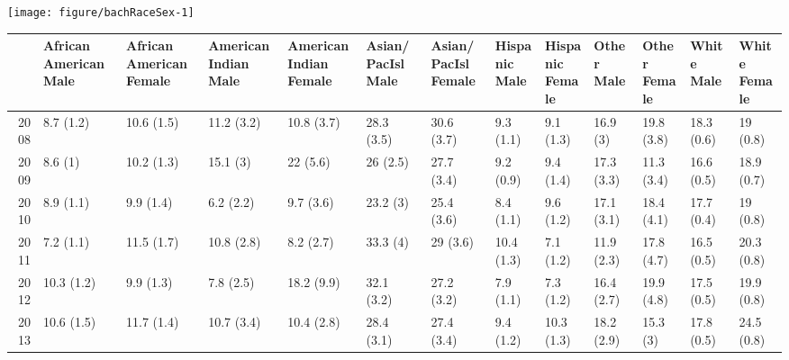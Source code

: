 \documentclass{article}\usepackage[]{graphicx}\usepackage[]{color}
\makeatletter
\def\maxwidth{ %
  \ifdim\Gin@nat@width>\linewidth
    \linewidth
  \else
    \Gin@nat@width
  \fi
}
\newenvironment{knitrout}{}{} %
\makeatother
\begin{document}
\begin{center}
\begin{knitrout}
\color{fgcolor}
\texttt{[image: figure/bachRaceSex-1]}

\end{knitrout}
\end{center}
\begin{landscape}
\begin{table}[ht]
\centering
\begin{tabular}{rllllllllllll}
  \hline
 & \thead{African American\\Male} & \thead{African American\\Female} & \thead{American Indian\\Male} & \thead{American Indian\\Female} & \thead{Asian/PacIsl\\Male} & \thead{Asian/PacIsl\\Female} & \thead{Hispanic\\Male} & \thead{Hispanic\\Female} & \thead{Other\\Male} & \thead{Other\\Female} & \thead{White\\Male} & \thead{White\\Female} \\
  \hline
2008 & 8.7 (1.2) & 10.6 (1.5) & 11.2 (3.2) & 10.8 (3.7) & 28.3 (3.5) & 30.6 (3.7) & 9.3 (1.1) & 9.1 (1.3) & 16.9 (3) & 19.8 (3.8) & 18.3 (0.6) & 19 (0.8) \\
  2009 & 8.6 (1) & 10.2 (1.3) & 15.1 (3) & 22 (5.6) & 26 (2.5) & 27.7 (3.4) & 9.2 (0.9) & 9.4 (1.4) & 17.3 (3.3) & 11.3 (3.4) & 16.6 (0.5) & 18.9 (0.7) \\
  2010 & 8.9 (1.1) & 9.9 (1.4) & 6.2 (2.2) & 9.7 (3.6) & 23.2 (3) & 25.4 (3.6) & 8.4 (1.1) & 9.6 (1.2) & 17.1 (3.1) & 18.4 (4.1) & 17.7 (0.4) & 19 (0.8) \\
  2011 & 7.2 (1.1) & 11.5 (1.7) & 10.8 (2.8) & 8.2 (2.7) & 33.3 (4) & 29 (3.6) & 10.4 (1.3) & 7.1 (1.2) & 11.9 (2.3) & 17.8 (4.7) & 16.5 (0.5) & 20.3 (0.8) \\
  2012 & 10.3 (1.2) & 9.9 (1.3) & 7.8 (2.5) & 18.2 (9.9) & 32.1 (3.2) & 27.2 (3.2) & 7.9 (1.1) & 7.3 (1.2) & 16.4 (2.7) & 19.9 (4.8) & 17.5 (0.5) & 19.9 (0.8) \\
  2013 & 10.6 (1.5) & 11.7 (1.4) & 10.7 (3.4) & 10.4 (2.8) & 28.4 (3.1) & 27.4 (3.4) & 9.4 (1.2) & 10.3 (1.3) & 18.2 (2.9) & 15.3 (3) & 17.8 (0.5) & 24.5 (0.8) \\

\end{tabular}
\end{table}
\end{landscape}
\end{document}
